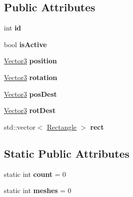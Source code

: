 \subsection*{Public Attributes}
\begin{DoxyCompactItemize}
\item 
\mbox{\label{class_model_aaada5cf29c31fafcc9515e28a6392841}} 
int {\bfseries id}
\item 
\mbox{\label{class_model_a76122dbc867c11d6a58f6275740b8c7c}} 
bool {\bfseries is\+Active}
\item 
\mbox{\label{class_model_a913145ab96ac03e2cc84c304742a5694}} 
\hyperlink{class_vector}{Vector3} {\bfseries position}
\item 
\mbox{\label{class_model_a236dc9e748a02c7eade9c851ecc039ce}} 
\hyperlink{class_vector}{Vector3} {\bfseries rotation}
\item 
\mbox{\label{class_model_a0e2b8e5997c2ed2754a9c3151bd42dfc}} 
\hyperlink{class_vector}{Vector3} {\bfseries pos\+Dest}
\item 
\mbox{\label{class_model_aaea3fca2bae892fb42b9370c613abe25}} 
\hyperlink{class_vector}{Vector3} {\bfseries rot\+Dest}
\item 
\mbox{\label{class_model_a766f9cc9861933cf0e3eedbd2373cc33}} 
std\+::vector$<$ \hyperlink{class_rectangle}{Rectangle} $>$ {\bfseries rect}
\end{DoxyCompactItemize}
\subsection*{Static Public Attributes}
\begin{DoxyCompactItemize}
\item 
\mbox{\label{class_model_a754668c2d0cfa749162b404f0d571566}} 
static int {\bfseries count} = 0
\item 
\mbox{\label{class_model_aea08808f395e20909162ccc14c2e458c}} 
static int {\bfseries meshes} = 0
\end{DoxyCompactItemize}


